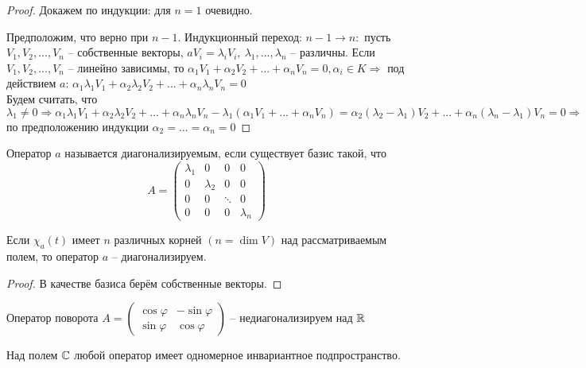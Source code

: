 \begin{proof}
	Докажем по индукции: для $n = 1$ очевидно.

	Предположим, что верно при $n-1$. Индукционный переход: $n-1 \to n:$ пусть $V_1, V_2, ..., V_n$ -- собственные векторы, $aV_i = \lambda_i V_i, \ \lambda_1, ..., \lambda_n$ -- различны.
	Если $V_1, V_2, ..., V_n$ -- линейно зависимы, то $\alpha_1 V_1 + \alpha_2 V_2 + ... + \alpha_n V_n = 0, \alpha_i \in K \Rightarrow$
	под действием $a$: $\alpha_1 \lambda_1 V_1 + \alpha_2 \lambda_2 V_2 + ... + \alpha_n \lambda_n V_n = 0$\\
	Будем считать, что $\lambda_1 \neq 0 \Rightarrow \alpha_1 \lambda_1 V_1 + \alpha_2 \lambda_2 V_2 + ... + \alpha_n \lambda_n V_n - \lambda_1(\alpha_1 V_1 + ... + \alpha_n V_n) =
	\alpha_2(\lambda_2 - \lambda_1)V_2 + ... + \alpha_n(\lambda_n - \lambda_1)V_n = 0 \Rightarrow$ по предположению индукции $\alpha_2 = ... = \alpha_n = 0$ 
\end{proof}

\begin{Def} 
	Оператор $a$ называется диагонализируемым, если существует базис такой, что $$A = \left(\begin{array}{cccc}
		\lambda_1 & 0 & 0 & 0\\
		0 & \lambda_2 & 0 & 0\\
		0 & 0 & \ddots & 0\\
		0 & 0 & 0 & \lambda_n
	\end{array}
	\right)$$
\end{Def} 

\begin{Thm} 
	Если $\chi_a(t)$ имеет $n$ различных корней $(n = \dim V)$ над рассматриваемым полем, то оператор $a$ -- диагонализируем. 
\end{Thm} 

\begin{proof}
	В качестве базиса берём собственные векторы. 
\end{proof}

\begin{Example}
	Оператор поворота $A = \left(\begin{array}{cc}
		\cos \varphi & - \sin \varphi\\
		\sin \varphi & \cos \varphi
	\end{array}\right)$ -- недиагонализируем над $\mathbb{R}$
\end{Example}

\begin{Lm}
	Над полем $\mathbb{C}$ любой оператор имеет одномерное инвариантное подпространство.
\end{Lm}

